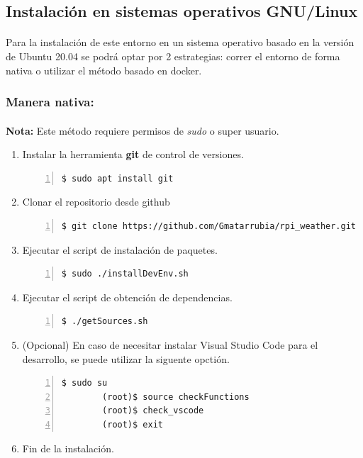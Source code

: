 \subsection{Instalación en sistemas operativos GNU/Linux}

\paragraph{}Para la instalación de este entorno en un sistema operativo basado en
la versión de Ubuntu 20.04 se podrá optar por 2 estrategias: correr el entorno de
forma nativa o utilizar el método basado en docker.

\subsubsection{Manera nativa:}

\paragraph{}\textbf{Nota:} Este método requiere permisos de \emph{sudo} o super usuario.

\begin{enumerate}
    \item Instalar la herramienta \textbf{\gls{git}} de control de versiones.
    \begin{lstlisting}[style=consola, numbers=left]
        $ sudo apt install git
    \end{lstlisting}

    \item Clonar el repositorio desde github
    \begin{lstlisting}[style=consola, numbers=left]
        $ git clone https://github.com/Gmatarrubia/rpi_weather.git
    \end{lstlisting}

    \item Ejecutar el script de instalación de paquetes.
    \begin{lstlisting}[style=consola, numbers=left]
        $ sudo ./installDevEnv.sh
    \end{lstlisting}

    \item Ejecutar el script de obtención de dependencias.
    \begin{lstlisting}[style=consola, numbers=left]
        $ ./getSources.sh
    \end{lstlisting}

    \item (Opcional) En caso de necesitar instalar Visual Studio Code para el desarrollo,
    se puede utilizar la siguente opctión.
    \begin{lstlisting}[style=consola, numbers=left]
        $ sudo su
        (root)$ source checkFunctions
        (root)$ check_vscode
        (root)$ exit
    \end{lstlisting}

    \item Fin de la instalación.
\end{enumerate}

